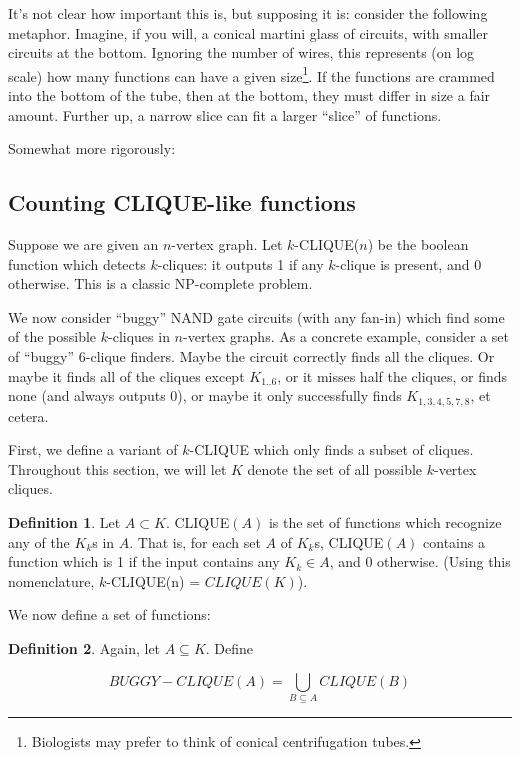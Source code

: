 \documentclass[12pt]{article}
\theoremstyle{definition}
\newtheorem{defn}{Definition}[section]
\begin{document}
It's not clear how important this is, but supposing it is: consider
the following metaphor. Imagine, if you will, a conical martini
glass of circuits, with smaller circuits at the bottom. Ignoring
the number of wires, this represents (on log scale) how many
functions can have a given size\footnote{Biologists may
prefer to think of conical centrifugation tubes.}.
If the functions are crammed into the bottom of the tube, then
at the bottom, they must differ in size a fair amount. Further up,
a narrow slice can fit a larger ``slice'' of functions.

Somewhat more rigorously:





\subsection{Counting CLIQUE-like functions}

Suppose we are given an $n$-vertex graph.
Let $k$-CLIQUE($n$) be the boolean function which
detects $k$-cliques: it outputs 1 if any $k$-clique
is present, and 0 otherwise. This is a classic
NP-complete problem.

We now consider ``buggy'' NAND gate circuits (with any fan-in) which find some of the possible $k$-cliques in $n$-vertex
graphs.
As a concrete example,
consider a set of ``buggy'' 6-clique finders. 
Maybe the circuit correctly
finds all the cliques. Or maybe it finds all of the cliques except $K_{1..6}$,
or it misses half the cliques, or finds none (and always outputs 0), or maybe
it only successfully finds $K_{1,3,4,5,7,8}$, et cetera.

First, we define a variant of $k$-CLIQUE which only
finds a subset of cliques. Throughout this section,
we will let $K$ denote the set of all possible
$k$-vertex cliques.

\begin{defn}
\label{CLIQUE}
Let $A \subset K$.
CLIQUE$(A)$ is the set of functions which recognize any of the $K_k$s in $A$. That is, for each set $A$ of $K_k$s, CLIQUE$(A)$
contains a function which is 1 if the input contains any $K_k \in A$,
and 0 otherwise. (Using this nomenclature,
$k$-CLIQUE(n) = $CLIQUE(K)$).
\end{defn}

We now define a set of functions:

\begin{defn}
\label{BUGGY-CLIQUE}
Again, let $A \subseteq K$. Define

\[
BUGGY-CLIQUE(A) = \bigcup_{B \subseteq A} CLIQUE(B)
\]
\end{defn}
\end{document}
